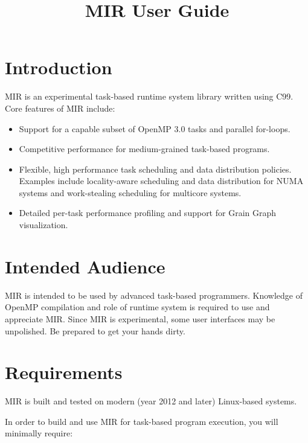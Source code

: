 \documentclass[11pt,a4paper]{article}
\title{MIR User Guide}
\begin{document}
\maketitle

\section{Introduction}\label{sec:introduction}

MIR is an experimental task-based runtime system library written using C99. Core features of MIR include:

\begin{itemize}
    \item Support for a capable subset of OpenMP 3.0 tasks and parallel for-loops.
    \item Competitive performance for medium-grained task-based programs.
    \item Flexible, high performance task scheduling and data distribution policies. Examples include locality-aware scheduling and data distribution for NUMA systems and work-stealing scheduling for multicore systems.
    \item Detailed per-task performance profiling and support for Grain Graph~\cite{muddukrishna2015grain} visualization.
\end{itemize}

\section{Intended Audience}\label{sec:intended-audience}

MIR is intended to be used by advanced task-based programmers. Knowledge of OpenMP compilation and role of runtime system is required to use and appreciate MIR. Since MIR is experimental, some user interfaces may be unpolished. Be prepared to get your hands dirty.

\section{Requirements}\label{sec:installation}

MIR is built and tested on modern (year 2012 and later) Linux-based systems.

In order to build and use MIR for task-based program execution, you will minimally require:
\end{document}
